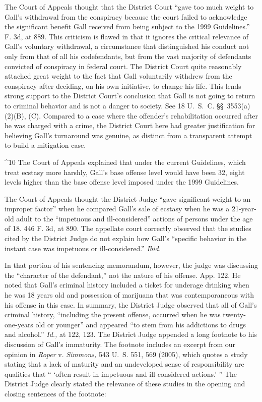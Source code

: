   The Court of Appeals thought that the District Court ``gave too
much weight to Gall's withdrawal from the conspiracy because the
court failed to acknowledge the significant benefit Gall received from
being subject to the 1999 Guidelines.'' F. 3d, at 889.
This criticism is flawed in that it ignores the critical relevance
of Gall's voluntary withdrawal, a circumstance that distinguished
his conduct not only from that of all his codefendants, but from the
vast ma\newpage jority of defendants convicted of conspiracy in federal
court. The District Court quite reasonably attached great weight to
the fact that Gall voluntarily withdrew from the conspiracy after
deciding, on his own initiative, to change his life. This lends strong
support to the District Court's conclusion that Gall is not going
to return to criminal behavior and is not a danger to society. See
18 U.~S.~C. \S\S~3553(a)(2)(B), (C). Compared to a case where the
offender's rehabilitation occurred after he was charged with a crime,
the District Court here had greater justification for believing Gall's
turnaround was genuine, as distinct from a transparent attempt to build
a mitigation case.

^10 The Court of Appeals explained that under the current Guidelines,
which treat ecstasy more harshly, Gall's base offense level would have
been 32, eight levels higher than the base offense level imposed under
the 1999 Guidelines.

  The Court of Appeals thought the District Judge ``gave significant
weight to an improper factor'' when he compared Gall's sale of
ecstasy when he was a 21-year-old adult to the ``impetuous and
ill-considered'' actions of persons under the age of 18. 446 F. 3d,
at 890. The appellate court correctly observed that the studies cited
by the District Judge do not explain how Gall's ``specific behavior
in the instant case was impetuous or ill-considered.'' \emph{Ibid.}

  In that portion of his sentencing memorandum, however, the judge
was discussing the ``character of the defendant,'' not the nature
of his offense. App. 122. He noted that Gall's criminal history
included a ticket for underage drinking when he was 18 years old and
possession of marijuana that was contemporaneous with his offense
in this case. In summary, the District Judge observed that all of
Gall's criminal history, ``including the present offense, occurred
when he was twenty-one-years old or younger'' and appeared ``to
stem from his addictions to drugs and alcohol.'' \emph{Id.,} at 122,
123. The District Judge appended a long footnote to his discussion
of Gall's immaturity. The footnote includes an excerpt from our
opinion in \emph{Roper} v. \emph{Simmons,} 543 U.~S. 551, 569 (2005),
which quotes a study stating that a lack of maturity and an undeveloped
sense of responsibility are qualities that `` ‘often result in
impetuous and ill-considered actions.' '' \newpage  The District Judge
clearly stated the relevance of these studies in the opening and closing
sentences of the footnote:

